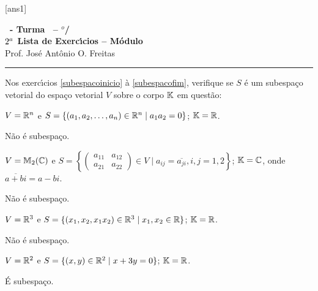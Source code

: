\documentclass[12pt]{exam}
\begin{document}
  [ans1]
  \begin{center}
    {\Large\bf \disciplina\ - Turma \turma\ -- \semestre$^{o}$/\ano} \\ \vspace{9pt} {\large\bf
        $2^a$ Lista de Exerc{\'\i}cios -- Módulo \numeromodulo}\\ \vspace{9pt} Prof. Jos{\'e} Ant{\^o}nio O. Freitas
  \end{center}
  \hrule





Nos exerc{\'\i}cios \ref{subespacoinicio} \`a \ref{subespacofim}, verifique se $S$ \'e um subespa\c{c}o vetorial do espa\c{c}o vetorial $V$ sobre o corpo $\mathbb{K}$ em quest\~ao:
\begin{exercicio}\label{subespacoinicio}
	$V = \mathbb{R}^n$ e $S = \{(a_1, a_2, \dots, a_n) \in \mathbb{R}^n \mid a_1a_2 = 0\}$; $\mathbb{K} = \mathbb{R}$.
	\begin{solucao}
		N\~ao \'e subespa\c{c}o.
	\end{solucao}
\end{exercicio}

\begin{exercicio}
	$V = \mathbb{M}_2(\mathbb{C})$ e $S = \left\{\begin{pmatrix} a_{11} & a_{12}\\ a_{21} & a_{22}\end{pmatrix} \in V \mid a_{ij} = \overline{a_{ji}}, i, j = 1, 2\right\}$; $\mathbb{K} = \mathbb{C}$, onde $\overline{a + bi} = a - bi$.
	\begin{solucao}
		N\~ao \'e subespa\c{c}o.
	\end{solucao}
\end{exercicio}

\begin{exercicio}
	$V = \mathbb{R}^3$ e $S = \{(x_1, x_2, x_1x_2) \in \mathbb{R}^3 \mid x_1, x_2 \in \mathbb{R}\}$; $\mathbb{K} = \mathbb{R}$.
	\begin{solucao}
		N\~ao \'e subespa\c{c}o.
	\end{solucao}
\end{exercicio}

\begin{exercicio}
	$V = \mathbb{R}^2$ e $S = \{(x, y) \in \mathbb{R}^2 \mid x + 3y = 0\}$; $\mathbb{K} = \mathbb{R}$.
	\begin{solucao}
		\'E subespa\c{c}o.
	\end{solucao}
\end{exercicio}
\end{document}
